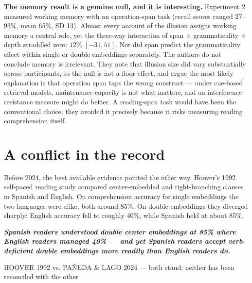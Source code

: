 \documentclass[11pt, a4paper]{article}
\begin{document}
\textbf{The memory result is a genuine null, and it is interesting.} Experiment 2 measured working memory with an operation-span task (recall scores ranged 27--93\%, mean 65\%, SD 13). Almost every account of the illusion assigns working memory a central role, yet the three-way interaction of span $\times$ grammaticality $\times$ depth straddled zero: $12\%$ $[-31,51]$. Nor did span predict the grammaticality effect within single or double embeddings separately. The authors do not conclude memory is irrelevant. They note that illusion size did vary substantially across participants, so the null is not a floor effect, and argue the most likely explanation is that operation span taps the wrong construct --- under cue-based retrieval models, maintenance capacity is not what matters, and an interference-resistance measure might do better. A reading-span task would have been the conventional choice; they avoided it precisely because it risks measuring reading comprehension itself.

\section{A conflict in the record}

Before 2024, the best available evidence pointed the other way. Hoover's 1992 self-paced reading study compared center-embedded and right-branching clauses in Spanish and English. On comprehension accuracy for single embeddings the two languages were alike, both around 85\%. On double embeddings they diverged sharply: English accuracy fell to roughly 40\%, while Spanish held at about 85\%.

\begin{tcolorbox}[colback=white, colframe=white, boxrule=0pt, leftrule=2.6pt, colbacklower=white, sharp corners, borderline west={2.6pt}{0pt}{oxblood}, left=16pt, right=4pt, top=6pt, bottom=6pt]
{\Large\bfseries\itshape Spanish readers understood double center embeddings at 85\% where English readers managed 40\% --- and yet Spanish readers accept verb-deficient double embeddings more readily than English readers do.}\par
\vspace{0.6em}
{\footnotesize\ttfamily\color{oxblood}HOOVER 1992 vs. PAÑEDA \& LAGO 2024 --- both stand; neither has been reconciled with the other}
\end{tcolorbox}
\vspace{0.6em}
\end{document}
